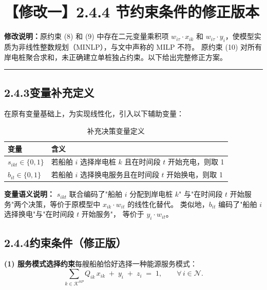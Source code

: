 \documentclass[11pt,a4paper]{article}
\begin{document}

\section*{【修改一】2.4.4 节约束条件的修正版本}

\noindent\textbf{修改说明：}原约束 (8) 和 (9) 中存在二元变量乘积项 $w_{i\tau} \cdot x_{ik}$
和 $w_{i\tau} \cdot y_i$，使模型实质为非线性整数规划（MINLP），与文中声称的 MILP 不符。
原约束 (10) 对所有岸电桩聚合求和，未正确建立单桩独占约束。以下给出完整修正方案。

\bigskip
\hrule
\bigskip

\subsection*{2.4.3\quad 变量补充定义}

在原有变量基础上，为实现线性化，引入以下辅助变量：

\begin{table}[h]
\centering
\caption{补充决策变量定义}
\begin{tabular}{ll}
\toprule
变量 & 含义 \\
\midrule
$s_{ikt} \in \{0,1\}$ & 若船舶 $i$ 选择岸电桩 $k$ 且在时间段 $t$ 开始充电，则取 1 \\
$b_{it} \in \{0,1\}$ & 若船舶 $i$ 选择换电服务且在时间段 $t$ 开始换电，则取 1 \\
\bottomrule
\end{tabular}
\end{table}

\noindent\textbf{变量语义说明：} $s_{ikt}$ 联合编码了"船舶 $i$ 分配到岸电桩 $k$"
与"在时间段 $t$ 开始服务"两个决策，等价于原模型中 $x_{ik} \cdot w_{it}$ 的线性化替代。
类似地，$b_{it}$ 编码了"船舶 $i$ 选择换电"与"在时间段 $t$ 开始服务"，
等价于 $y_i \cdot w_{it}$。

\subsection*{2.4.4\quad 约束条件（修正版）}

\medskip
\noindent\textbf{(1) 服务模式选择约束}\quad 每艘船舶恰好选择一种能源服务模式：
%
\begin{equation}
  \sum_{k \in \mathcal{K}^{SP}} Q_{ik}\, x_{ik} \;+\; y_i \;+\; z_i \;=\; 1,
  \qquad \forall\, i \in \mathcal{N}.
  \tag{5}
\end{equation}
\end{document}
